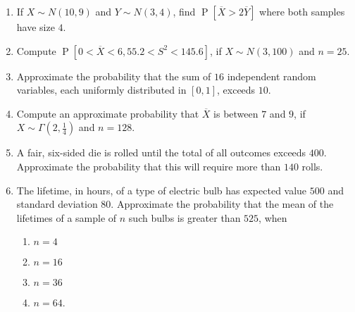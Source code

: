 \documentclass[svgnames]{amsart}
\DeclareMathOperator{\Prob}{P}
\begin{document}
\begin{enumerate}[leftmargin=*, itemsep=0.3em]
\item If $X \sim N(10, 9)$ and $Y \sim N(3, 4)$, find $\Prob[\overline X > 2 \overline Y]$ where both samples have size $4$.

\item Compute $\Prob[0 < \overline X < 6, 55.2 < S^2 < 145.6]$, if $X \sim N(3, 100)$ and $n = 25$.

\item Approximate the probability that the sum of $16$ independent random variables, each uniformly distributed in $[0, 1]$, exceeds $10$.

\item Compute an approximate probability that $\overline X$ is between $7$ and $9$, if $X \sim \Gamma(2, \frac 1 4)$ and $n = 128$.

\item A fair, six-sided die is rolled until the total of all outcomes exceeds $400$. Approximate the probability that this will require more than $140$ rolls.

\item The lifetime, in hours, of a type of electric bulb has expected value $500$ and standard deviation $80$. Approximate the probability that the mean of the lifetimes of a sample of $n$ such bulbs is greater than $525$, when
\begin{enumerate}[label=(\roman*)]
\item $n = 4$
\item $n = 16$
\item $n = 36$
\item $n = 64$.
\end{enumerate}

\end{enumerate}
\end{document}
